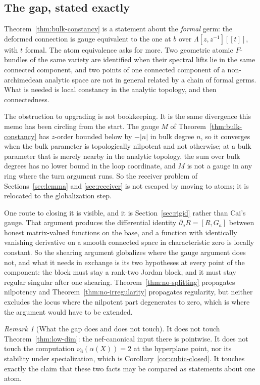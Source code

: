 \documentclass[11pt]{article}
\theoremstyle{definition}
\theoremstyle{remark}
\newtheorem{remark}[theorem]{Remark}
\begin{document}
\subsection*{The gap, stated exactly}
\label{sec:endpoint-gap}

Theorem~\ref{thm:bulk-constancy} is a statement about the \emph{formal} germ: the
deformed connection is gauge equivalent to the one at $b$ over
$\Lambda[z,z^{-1}][[t]]$, with $t$ formal. The atom equivalence asks for more.
Two geometric atomic $F$-bundles of the same variety are identified when their
spectral lifts lie in the same connected component, and two points of one
connected component of a non-archimedean analytic space are not in general
related by a chain of formal germs. What is needed is local constancy in the
analytic topology, and then connectedness.

The obstruction to upgrading is not bookkeeping. It is the same divergence this
memo has been circling from the start. The gauge $M$ of
Theorem~\ref{thm:bulk-constancy} has $z$-order bounded below by $-|n|$ in bulk
degree $n$, so it converges when the bulk parameter is topologically nilpotent
and not otherwise; at a bulk parameter that is merely nearby in the analytic
topology, the sum over bulk degrees has no lower bound in the loop coordinate,
and $M$ is not a gauge in any ring where the turn argument runs. So the
receiver problem of Sections~\ref{sec:lemma} and \ref{sec:receiver} is not
escaped by moving to atoms; it is relocated to the globalization step.

One route to closing it is visible, and it is Section~\ref{sec:rigid} rather
than Cai's gauge. That argument produces the differential identity
$\partial_aR=[R,G_a]$ between honest matrix-valued functions on the base, and a
function with identically vanishing derivative on a smooth connected space in
characteristic zero is locally constant. So the shearing argument globalizes
where the gauge argument does not, and what it needs in exchange is its two
hypotheses at every point of the component: the block must stay a rank-two
Jordan block, and it must stay regular singular after one shearing.
Theorem~\ref{thm:no-splitting} propagates nilpotency and
Theorem~\ref{thm:no-irregularity} propagates regularity, but neither excludes
the locus where the nilpotent part degenerates to zero, which is where the
argument would have to be extended.

\begin{remark}[What the gap does and does not touch]
It does not touch Theorem~\ref{thm:low-dim}: the nef-canonical input there is
pointwise. It does not touch the computation
$\nu_6(\alpha(X))=2$ at the hyperplane point, nor its stability under
specialization, which is Corollary~\ref{cor:cubic-closed}. It touches exactly
the claim that these two facts may be compared as statements about one atom.
\end{remark}
\end{document}
